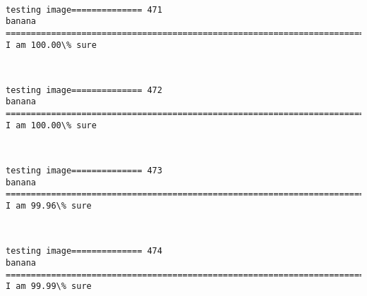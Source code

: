 \documentclass[11pt]{article}
\begin{document}
    \begin{center}
    \end{center}
    { \hspace*{\fill} \\}
    
    \begin{Verbatim}[commandchars=\\\{\}]
testing image============== 471
banana
============================================================================
I am 100.00\% sure

    \end{Verbatim}

    \begin{center}
    \end{center}
    { \hspace*{\fill} \\}
    
    \begin{Verbatim}[commandchars=\\\{\}]
testing image============== 472
banana
============================================================================
I am 100.00\% sure

    \end{Verbatim}

    \begin{center}
    \end{center}
    { \hspace*{\fill} \\}
    
    \begin{Verbatim}[commandchars=\\\{\}]
testing image============== 473
banana
============================================================================
I am 99.96\% sure

    \end{Verbatim}

    \begin{center}
    \end{center}
    { \hspace*{\fill} \\}
    
    \begin{Verbatim}[commandchars=\\\{\}]
testing image============== 474
banana
============================================================================
I am 99.99\% sure

    \end{Verbatim}
\end{document}
